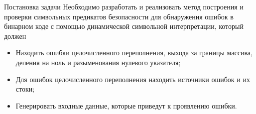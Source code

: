 \documentclass[10pt]{beamer}
\begin{document}
%

\begin{frame}{Постановка задачи}
Необходимо разработать и реализовать метод построения и проверки символьных
предикатов безопасности для обнаружения ошибок в бинарном коде с помощью динамической
символьной интерпретации, который должен
\begin{itemize}
    \item Находить ошибки целочисленного переполнения, выхода за границы
        массива, деления на ноль и разыменования нулевого указателя;
    \item Для ошибок целочисленного переполнения находить источники ошибок и их
        стоки;
    \item Генерировать входные данные, которые приведут к проявлению ошибки.
\end{itemize}
\end{frame}
\end{document}
